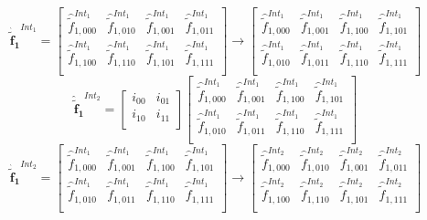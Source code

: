\documentclass[12pt,Bold,letterpaper,TexShade]{mcgilletdclass}
\numberwithin{equation}{section}
\newcommand{\vect}[1]{\bm{{#1}}}
\begin{document}
\begin{enumerate}
\begin{equation} \nonumber
\vect{\hat{\tilde{f}}_{1}}^{Int_1}
=
\begin{bmatrix}
\hat{\tilde{f}}^{Int_1}_{1,000} & \hat{\tilde{f}}^{Int_1}_{1,010} & \hat{\tilde{f}}^{Int_1}_{1,001} & \hat{\tilde{f}}^{Int_1}_{1,011} \\
\hat{\tilde{f}}^{Int_1}_{1,100} & \hat{\tilde{f}}^{Int_1}_{1,110} & \hat{\tilde{f}}^{Int_1}_{1,101} & \hat{\tilde{f}}^{Int_1}_{1,111} \\
\end{bmatrix}
\rightarrow
\begin{bmatrix}
\hat{\tilde{f}}^{Int_1}_{1,000} & \hat{\tilde{f}}^{Int_1}_{1,001} & \hat{\tilde{f}}^{Int_1}_{1,100} & \hat{\tilde{f}}^{Int_1}_{1,101} \\
\hat{\tilde{f}}^{Int_1}_{1,010} & \hat{\tilde{f}}^{Int_1}_{1,011} & \hat{\tilde{f}}^{Int_1}_{1,110} & \hat{\tilde{f}}^{Int_1}_{1,111} \\
\end{bmatrix}
\end{equation}
\begin{equation} \nonumber
\vect{\hat{\tilde{f}}_{1}}^{Int_2}
=
\begin{bmatrix}
i_{00} & i_{01} \\
i_{10} & i_{11} \\
\end{bmatrix}
\begin{bmatrix}
\hat{\tilde{f}}^{Int_1}_{1,000} & \hat{\tilde{f}}^{Int_1}_{1,001} & \hat{\tilde{f}}^{Int_1}_{1,100} & \hat{\tilde{f}}^{Int_1}_{1,101} \\
\hat{\tilde{f}}^{Int_1}_{1,010} & \hat{\tilde{f}}^{Int_1}_{1,011} & \hat{\tilde{f}}^{Int_1}_{1,110} & \hat{\tilde{f}}^{Int_1}_{1,111} \\
\end{bmatrix}
\end{equation}
\begin{equation} \nonumber
\vect{\hat{\tilde{f}}_{1}}^{Int_2}
=
\begin{bmatrix}
\hat{\tilde{f}}^{Int_1}_{1,000} & \hat{\tilde{f}}^{Int_1}_{1,001} & \hat{\tilde{f}}^{Int_1}_{1,100} & \hat{\tilde{f}}^{Int_1}_{1,101} \\
\hat{\tilde{f}}^{Int_1}_{1,010} & \hat{\tilde{f}}^{Int_1}_{1,011} & \hat{\tilde{f}}^{Int_1}_{1,110} & \hat{\tilde{f}}^{Int_1}_{1,111} \\
\end{bmatrix}
\rightarrow
\begin{bmatrix}
\hat{\tilde{f}}^{Int_2}_{1,000} & \hat{\tilde{f}}^{Int_2}_{1,010} & \hat{\tilde{f}}^{Int_2}_{1,001} & \hat{\tilde{f}}^{Int_2}_{1,011} \\
\hat{\tilde{f}}^{Int_2}_{1,100} & \hat{\tilde{f}}^{Int_2}_{1,110} & \hat{\tilde{f}}^{Int_2}_{1,101} & \hat{\tilde{f}}^{Int_2}_{1,111} \\
\end{bmatrix}
\end{equation}


\end{enumerate}
\end{document}
